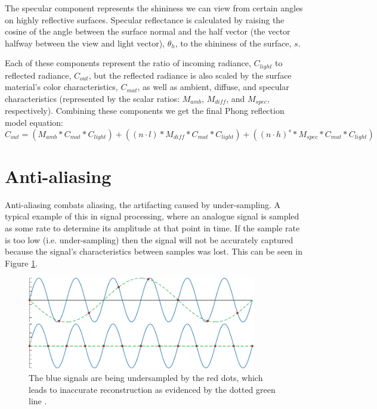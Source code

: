 The specular component represents the shininess we can view from certain angles on highly reflective surfaces. Specular reflectance is calculated by raising the cosine of the angle between the surface normal and the half vector (the vector halfway between the view and light vector), $\theta_{h}$, to the shininess of the surface, $s$.

Each of these components represent the ratio of incoming radiance, $C_{light}$ to reflected radiance, $C_{out}$, but the reflected radiance is also scaled by the surface material's color characteristics, $C_{mat}$, as well as ambient, diffuse, and specular characteristics (represented by the scalar ratios: $M_{amb}$, $M_{diff}$, and $M_{spec}$, respectively). Combining these components we get the final Phong reflection model equation:
\begin{equation}
C_{out} = (M_{amb} * C_{mat} * C_{light}) + ((n \cdot l) * M_{diff} * C_{mat} * C_{light}) + ((n \cdot h) ^s * M_{spec} * C_{mat} * C_{light})
\label{eqn:phong}
\end{equation}

\section{Anti-aliasing}
\label{sec:anti-aliasing}
Anti-aliasing combats aliasing, the artifacting caused by under-sampling. A typical example of this in signal processing, where an analogue signal is sampled as some rate to determine its amplitude at that point in time. If the sample rate is too low (i.e. under-sampling) then the signal will not be accurately captured because the signal's characteristics between samples was lost. This can be seen in Figure \ref{fig:undersampling}.

\begin{figure}[h!]
   \centering
   \includegraphics[width=100mm]{../img/RTR3_05_21_undersampling.png}
   \captionfonts
   \caption[Signal Undersampling]{The blue signals are being undersampled by the red dots, which leads to inaccurate reconstruction as evidenced by the dotted green line \cite{bib:rtr}.}
   \label{fig:undersampling}
\end{figure}

